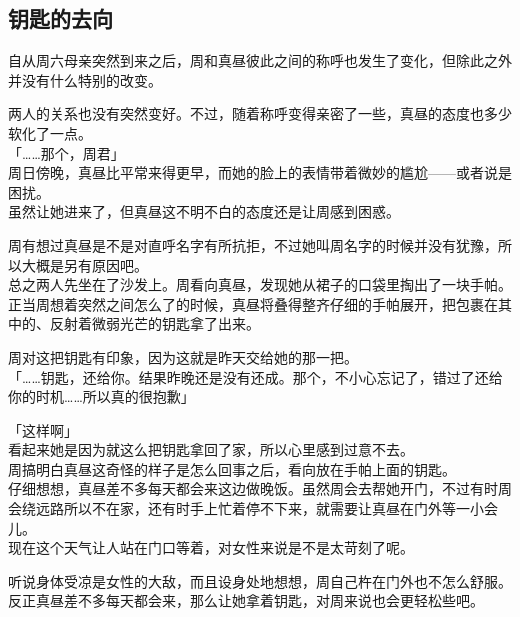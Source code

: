 \subsection{钥匙的去向}

自从周六母亲突然到来之后，周和真昼彼此之间的称呼也发生了变化，但除此之外并没有什么特别的改变。

两人的关系也没有突然变好。不过，随着称呼变得亲密了一些，真昼的态度也多少软化了一点。\\

「……那个，周君」\\

周日傍晚，真昼比平常来得更早，而她的脸上的表情带着微妙的尴尬——或者说是困扰。\\

虽然让她进来了，但真昼这不明不白的态度还是让周感到困惑。

周有想过真昼是不是对直呼名字有所抗拒，不过她叫周名字的时候并没有犹豫，所以大概是另有原因吧。\\

总之两人先坐在了沙发上。周看向真昼，发现她从裙子的口袋里掏出了一块手帕。\\

正当周想着突然之间怎么了的时候，真昼将叠得整齐仔细的手帕展开，把包裹在其中的、反射着微弱光芒的钥匙拿了出来。

周对这把钥匙有印象，因为这就是昨天交给她的那一把。\\

「……钥匙，还给你。结果昨晚还是没有还成。那个，不小心忘记了，错过了还给你的时机……所以真的很抱歉」

「这样啊」\\

看起来她是因为就这么把钥匙拿回了家，所以心里感到过意不去。\\

周搞明白真昼这奇怪的样子是怎么回事之后，看向放在手帕上面的钥匙。\\

仔细想想，真昼差不多每天都会来这边做晚饭。虽然周会去帮她开门，不过有时周会绕远路所以不在家，还有时手上忙着停不下来，就需要让真昼在门外等一小会儿。\\

现在这个天气让人站在门口等着，对女性来说是不是太苛刻了呢。

听说身体受凉是女性的大敌，而且设身处地想想，周自己杵在门外也不怎么舒服。\\

反正真昼差不多每天都会来，那么让她拿着钥匙，对周来说也会更轻松些吧。\\

